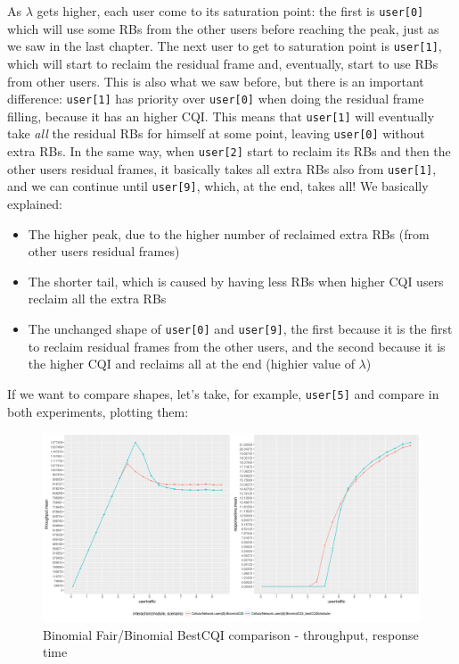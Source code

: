 As \(\lambda\) gets higher, each user come to its saturation point: the first is \texttt{user[0]} which will use some RBs from the other users before reaching the peak, just as we saw in the last chapter. The next user to get to saturation point is \texttt{user[1]}, which will start to reclaim the residual frame and, eventually, start to use RBs from other users. This is also what we saw before, but there is an important difference: \texttt{user[1]} has priority over \texttt{user[0]} when doing the residual frame filling, because it has an higher CQI. This means that \texttt{user[1]} will eventually take \textit{all} the residual RBs for himself at some point, leaving \texttt{user[0]} without extra RBs. In the same way, when \texttt{user[2]} start to reclaim its RBs and then the other users residual frames, it basically takes all extra RBs also from \texttt{user[1]}, and we can continue until \texttt{user[9]}, which, at the end, takes all!
We basically explained:
\begin{itemize}
	\item The higher peak, due to the higher number of reclaimed extra RBs (from other users residual frames)
	\item The shorter tail, which is caused by having less RBs when higher CQI users reclaim all the extra RBs
	\item The unchanged shape of \texttt{user[0]} and \texttt{user[9]}, the first because it is the first to reclaim residual frames from the other users, and the second because it is the higher CQI and reclaims all at the end (highier value of \(\lambda\))
\end{itemize}

If we want to compare shapes, let's take, for example, \texttt{user[5]} and compare in both experiments, plotting them:

\begin{figure}[H]
  \includegraphics[width=1\textwidth]{images/th-binom-binombest-5-5.png}
  \caption{Binomial Fair/Binomial BestCQI comparison - throughput, response time}
  \label{fig:th-binom-binombest-5-5}
\end{figure}

